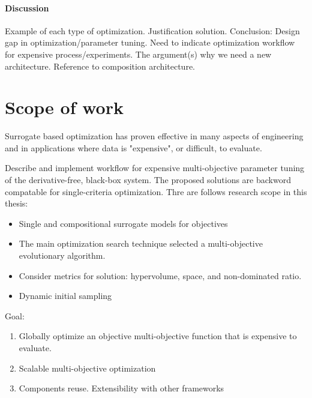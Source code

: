         \paragraph{Discussion}


        Example of each type of optimization. Justification solution.
        Conclusion: Design gap in optimization/parameter tuning. 
        Need to indicate optimization workflow for expensive process/experiments. 
        The argument(s) why we need a new architecture. Reference to composition architecture.




    \section{Scope of work}
        Surrogate based optimization has proven effective in many aspects of engineering and in applications where data is "expensive", or difficult, to evaluate.

        Describe and implement workflow for expensive multi-objective parameter tuning of the derivative-free, black-box system. The proposed solutions are backword compatable for single-criteria optimization. 
        Thre are follows research scope in this thesis:
        \begin{itemize}
            \item Single and compositional surrogate models for objectives
            \item The main optimization search technique selected a multi-objective evolutionary algorithm.
            \item Consider metrics for solution: hypervolume, space, and non-dominated ratio.
            \item Dynamic initial sampling
        \end{itemize}

        Goal:
        \begin{enumerate}
            \item Globally optimize an objective multi-objective function that is expensive to evaluate.
            \item Scalable multi-objective optimization
            \item Components reuse. Extensibility with other frameworks
        \end{enumerate}

